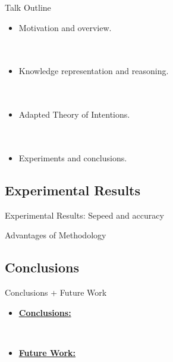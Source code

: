 \documentclass[xcolor=dvipsnames]{beamer}
\begin{document}
\begin{frame}{Talk Outline}
  \begin{itemize}
  \item  Motivation and overview.
    \ \\
    \ \\
    \ \\
  \item Knowledge representation and reasoning.
    \ \\
    \ \\
    \ \\
  \item Adapted Theory of Intentions.
    \ \\
    \ \\
    \ \\
  \item Experiments and conclusions.
  \end{itemize}
\end{frame}





\subsection{Experimental Results}

\begin{frame}{Experimental Results: Sepeed and accuracy}

\end{frame}




\begin{frame}{Advantages of Methodology}

\end{frame}



\subsection{Conclusions}

\begin{frame}{Conclusions + Future Work}\small
  \begin{itemize}
    \item \textbf{\underline{Conclusions:}}


    \ \\
  \item \textbf{\underline{Future Work:}}
  \end{itemize}
\end{frame}
\end{document}
